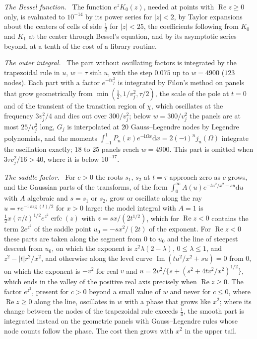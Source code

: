 \documentclass[ecta,nameyear,final,supplement]{econsocart}
\newcommand{\dr}[1]{{\mathrm d}#1}
\newcommand{\iu}{{\mathrm i}}
\newcommand{\Rea}{\operatorname{Re}}
\newcommand{\Ima}{\operatorname{Im}}
\newcommand{\erfc}{\operatorname{erfc}}
\theoremstyle{plain}
\theoremstyle{definition}
\newcommand{\runin}[1]{\par\medskip\noindent\textit{#1.}\ \ignorespaces}
\begin{document}
\runin{The Bessel function}  The function $e^zK_0(z)$, needed at points with $\Rea z\ge0$ only, is evaluated to $10^{-14}$ by its power series for $|z|<2$, by Taylor expansions about the centers of cells of side $\frac12$ for $|z|<25$, the coefficients following from $K_0$ and $K_1$ at the center through Bessel's equation, and by its asymptotic series beyond, at a tenth of the cost of a library routine.

\runin{The outer integral}  The part without oscillating factors is integrated by the trapezoidal rule in $u$, $w=\tau\sinh u$, with the step $0.075$ up to $w=4900$ ($123$ nodes).  Each part with a factor $e^{-tv_j^2}$ is integrated by Filon's method on panels that grow geometrically from $\min(\frac12,1/v_j^2,\tau/2)$, the scale of the pole at $t=0$ and of the transient of the transition region of $\chi$, which oscillates at the frequency $3v_j^2/4$ and dies out over $300/v_j^2$; below $w=300/v_j^2$ the panels are at most $25/v_j^2$ long, $G_j$ is interpolated at $20$ Gauss--Legendre nodes by Legendre polynomials, and the moments $\int_{-1}^1P_n(x)e^{-\iu\Omega x}\dr{x}=2(-\iu)^nj_n(\Omega)$ integrate the oscillation exactly; $18$ to $25$ panels reach $w=4900$.  This part is omitted when $3\tau v_j^2/16>40$, where it is below $10^{-17}$.

\runin{The saddle factor}  For $c>0$ the roots $s_1$, $s_2$ at $t=\tau$ approach zero as $c$ grows, and the Gaussian parts of the transforms, of the form $\int_0^\infty A(u)e^{-tu^2/x^2-su}\dr{u}$ with $A$ algebraic and $s=s_1$ or $s_2$, grow or oscillate along the ray $u=re^{-\iu\arg(t)/2}$ for $x>0$ large: the model integral with $A=1$ is $\frac12x(\pi/t)^{1/2}e^{z^2}\erfc(z)$ with $z=sx/(2t^{1/2})$, which for $\Rea z<0$ contains the term $2e^{z^2}$ of the saddle point $u_0=-sx^2/(2t)$ of the exponent.  For $\Rea z<0$ these parts are taken along the segment from $0$ to $u_0$ and the line of steepest descent from $u_0$, on which the exponent is $z^2\lambda(2-\lambda)$, $0\le\lambda\le1$, and $z^2-|t|r^2/x^2$, and otherwise along the level curve $\Ima(tu^2/x^2+su)=0$ from $0$, on which the exponent is $-v^2$ for real $v$ and $u=2v^2/\{s+(s^2+4tv^2/x^2)^{1/2}\}$, which ends in the valley of the positive real axis precisely when $\Rea z\ge0$.  The factor $e^{z^2}$, present for $c>0$ beyond a small value of $w$ and never for $c\le0$, where $\Rea z\ge0$ along the line, oscillates in $w$ with a phase that grows like $x^2$; where its change between the nodes of the trapezoidal rule exceeds $\frac14$, the smooth part is integrated instead on the geometric panels with Gauss--Legendre rules whose node counts follow the phase.  The cost then grows with $x^2$ in the upper tail.
\end{document}
